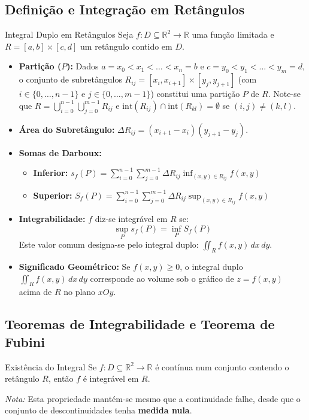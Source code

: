 \documentclass[11pt,a4paper]{article}
\newcommand{\R}{\mathbb{R}}
\begin{document}
\subsection{Definição e Integração em Retângulos}

\begin{definitionbox}{Integral Duplo em Retângulos}
  Seja $f : D \subseteq \R^2 \to \R$ uma função limitada e $R = [a, b] \times [c, d]$ um retângulo contido em $D$.
  \begin{itemize}
    \item \textbf{Partição ($P$):} Dados $a = x_0 < x_1 < \dots < x_n = b$ e $c = y_0 < y_1 < \dots < y_m = d$, o conjunto de subretângulos $R_{ij} = [x_i, x_{i+1}] \times [y_j, y_{j+1}]$ (com $i \in \{0, \dots, n-1\}$ e $j \in \{0, \dots, m-1\}$) constitui uma partição $P$ de $R$. Note-se que $R = \bigcup_{i=0}^{n-1}\bigcup_{j=0}^{m-1} R_{ij}$ e $\text{int}(R_{ij}) \cap \text{int}(R_{kl}) = \emptyset$ se $(i,j) \neq (k,l)$.
    \item \textbf{Área do Subretângulo:} $\Delta R_{ij} = (x_{i+1} - x_i)(y_{j+1} - y_j)$.
    \item \textbf{Somas de Darboux:}
      \begin{itemize}
        \item \textbf{Inferior:} $s_f(P) = \sum_{i=0}^{n-1} \sum_{j=0}^{m-1} \Delta R_{ij} \inf_{(x,y) \in R_{ij}} f(x, y)$
        \item \textbf{Superior:} $S_f(P) = \sum_{i=0}^{n-1} \sum_{j=0}^{m-1} \Delta R_{ij} \sup_{(x,y) \in R_{ij}} f(x, y)$
      \end{itemize}
    \item \textbf{Integrabilidade:} $f$ diz-se integrável em $R$ se:
      \[ \sup_{P} s_f(P) = \inf_{P} S_f(P) \]
      Este valor comum designa-se pelo integral duplo: $\iint_R f(x, y) \, dx \, dy$.
    \item \textbf{Significado Geométrico:} Se $f(x, y) \ge 0$, o integral duplo $\iint_R f(x, y) \, dx \, dy$ corresponde ao volume sob o gráfico de $z = f(x, y)$ acima de $R$ no plano $xOy$.
  \end{itemize}
\end{definitionbox}

\subsection{Teoremas de Integrabilidade e Teorema de Fubini}

\noindent\begin{theorembox}{Existência do Integral}
  Se $f : D \subseteq \R^2 \to \R$ é contínua num conjunto contendo o retângulo $R$, então $f$ é integrável em $R$.
  
  \textit{Nota:} Esta propriedade mantém-se mesmo que a continuidade falhe, desde que o conjunto de descontinuidades tenha \textbf{medida nula}.
\end{theorembox}
\end{document}
